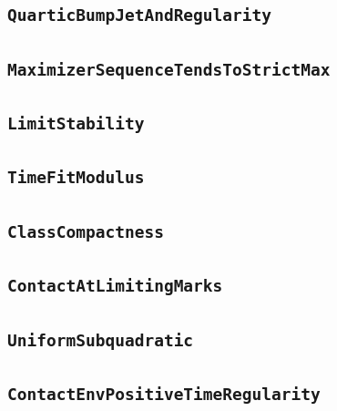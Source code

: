 \documentclass[11pt]{amsart}
\theoremstyle{definition}
\begin{document}
\subsection{\texorpdfstring{\texttt{QuarticBumpJetAndRegularity}}{QuarticBumpJetAndRegularity}}\label{node:QuarticBumpJetAndRegularity}


\subsection{\texorpdfstring{\texttt{MaximizerSequenceTendsToStrictMax}}{MaximizerSequenceTendsToStrictMax}}\label{node:MaximizerSequenceTendsToStrictMax}


\subsection{\texorpdfstring{\texttt{LimitStability}}{LimitStability}}\label{node:LimitStability}


\subsection{\texorpdfstring{\texttt{TimeFitModulus}}{TimeFitModulus}}\label{node:TimeFitModulus}


\subsection{\texorpdfstring{\texttt{ClassCompactness}}{ClassCompactness}}\label{node:ClassCompactness}


\subsection{\texorpdfstring{\texttt{ContactAtLimitingMarks}}{ContactAtLimitingMarks}}\label{node:ContactAtLimitingMarks}


\subsection{\texorpdfstring{\texttt{UniformSubquadratic}}{UniformSubquadratic}}\label{node:UniformSubquadratic}


\subsection{\texorpdfstring{\texttt{ContactEnvPositiveTimeRegularity}}{ContactEnvPositiveTimeRegularity}}\label{node:ContactEnvPositiveTimeRegularity}

\end{document}
